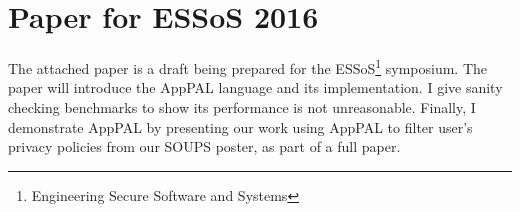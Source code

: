 \documentclass[a4paper]{scrartcl}
\begin{document}
\section{Paper for ESSoS 2016}

The attached paper is a draft being prepared for the ESSoS\footnote{Engineering Secure Software and Systems} symposium.
The paper will introduce the AppPAL language and its implementation.
I give sanity checking benchmarks to show its performance is not unreasonable.
Finally, I demonstrate AppPAL by presenting our work using AppPAL to filter user's privacy policies from our SOUPS poster, as part of a full paper.


\end{document}
